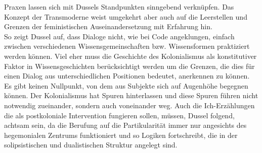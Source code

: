 \noindent Praxen lassen sich mit Dussels Standpunkten sinngebend verknüpfen. Das Konzept
der Transmoderne weist umgekehrt aber auch auf die Leerstellen und Grenzen der
feministischen Auseinandersetzung mit Erfahrung hin.\\
So zeigt Dussel auf, dass
Dialoge nicht, wie bei Code angeklungen, einfach zwischen verschiedenen
Wissensgemeinschaften bzw. Wissensformen praktiziert werden können. Viel eher
muss die Geschichte des Kolonialismus als konstitutiver Faktor in
Wissensgeschichten berücksichtigt werden um die Grenzen, die dies für einen
Dialog aus unterschiedlichen Positionen bedeutet, anerkennen zu können. Es gibt
keinen Nullpunkt, von dem aus Subjekte sich auf Augenhöhe begegnen können. Der
Kolonialismus hat Spuren hinterlassen und diese Spuren führen nicht notwendig
zueinander, sondern auch voneinander weg. Auch die Ich-Erzählungen die als
postkoloniale Intervention fungieren sollen, müssen, Dussel folgend, achtsam
sein, da die Berufung auf die Partikularität immer nur angesichts des
hegemonialen Zentrums funktioniert und so Logiken fortschreibt, die in der
solipsistischen und dualistischen Struktur angelegt sind.
